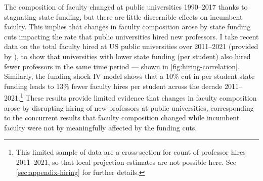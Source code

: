 The composition of faculty changed at public universities 1990--2017 thanks to stagnating state funding, but there are little discernible effects on incumbent faculty.
This implies that changes in faculty composition arose by state funding cuts impacting the rate that public universities hired new professors.
I take recent data on the total faculty hired at US public universities over 2011--2021 (provided by \citealt{wapman2022quantifying,wapman2022zenodo}), to show that universities with lower state funding (per student) also hired fewer professors in the same time period --- shown in \autoref{fig:hiring-correlation}.
Similarly, the funding shock IV model shows that a $10$\% cut in per student state funding leads to $13$\% fewer faculty hires per student across the decade 2011--2021.\footnote{
    This limited sample of data are a cross-section for count of professor hires 2011--2021, so that local projection estimates are not possible here.
    See \autoref{sec:appendix-hiring} for further details.
}
These results provide limited evidence that changes in faculty composition arose by disrupting hiring of new professors at public universities, corresponding to the concurrent results that faculty composition changed while incumbent faculty were not by meaningfully affected by the funding cuts.
